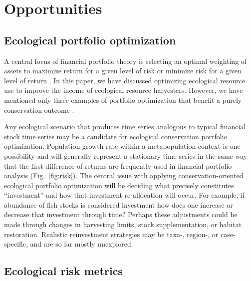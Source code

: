 

\section{Opportunities}\label{opportunities}

\subsection{Ecological portfolio optimization}\label{ecological-portfolio-optimization}

A central focus of financial portfolio theory is selecting an optimal weighting of assets to maximize return for a given level of risk or minimize risk for a given level of return \citep{markowitz1952}. In this paper, we have discussed optimizing ecological resource use to improve the income of ecological resource harvesters. However, we have mentioned only three examples of portfolio optimization that benefit a purely conservation outcome \citep{crowe2008, ando2012, anderson2014}.

Any ecological scenario that produces time series analogous to typical financial stock time series may be a candidate for ecological conservation portfolio optimization. Population growth rate within a metapopulation context is one possibility and will generally represent a stationary time series in the same way that the first difference of returns are frequently used in financial portfolio analysis \citep{anderson2014} (Fig.~\ref{fig:risk}). The central issue with applying conservation-oriented ecological portfolio optimization will be deciding what precisely constitutes ``investment'' and how that investment re-allocation will occur. For example, if abundance of fish stocks is considered investment how does one increase or decrease that investment through time? Perhaps these adjustments could be made through changes in harvesting limits, stock supplementation, or habitat restoration. Realistic reinvestment strategies may be taxa-, region-, or case-specific, and are so far mostly unexplored.

\subsection{Ecological risk metrics}\label{ecological-risk-metrics}

